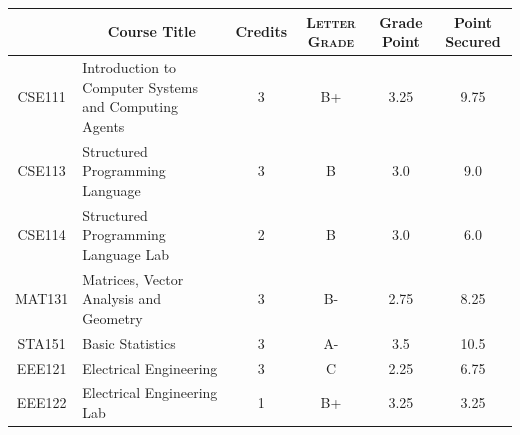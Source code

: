 \documentclass[11pt]{article}
\newcommand*{\numtwo}[1]{\pgfmathprintnumber[
                    fixed, precision=2, fixed zerofill=true]{#1}}
\begin{document}
                \begin{center}
                    \renewcommand{\arraystretch}{1.08}
                    
                \begin{tabular}{|c|l|c|>{\scshape}c|c|c|}
                \hline  \rule[-1ex]{0pt}{3.5ex} {\centering{\bf Course Code}} &  \multicolumn{1}{c|}{\textbf{Course Title}}  & {\bf Credits} & {\bf Letter Grade} & {\bf Grade Point} & {\bf Point Secured}  \\ 
                \hline   CSE111 &  Introduction to Computer Systems and Computing Agents		 & 3 & B+ & 3.25 & 9.75 \\ %
                \hline   CSE113 &  Structured Programming Language		 & 3 & B & 3.0 & 9.0 \\ %
                \hline   CSE114 &  Structured Programming Language Lab		 & 2 & B & 3.0 & 6.0 \\ %
                \hline   MAT131 &  Matrices, Vector Analysis and Geometry		 & 3 & B- & 2.75 & 8.25 \\ %
                \hline   STA151 &  Basic Statistics		 & 3 & A- & 3.5 & 10.5 \\ %
                \hline   EEE121 &  Electrical Engineering		 & 3 & C & 2.25 & 6.75 \\ %
                \hline   EEE122 &  Electrical Engineering Lab		 & 1 & B+ & 3.25 & 3.25 \\ %

\hline                %
                \end{tabular}
                \end{center}
                \renewcommand{\arraystretch}{1.03}
\end{document}
